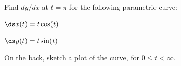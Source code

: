 Find $dy/dx$ at $t=\pi$ for the following parametric curve:

\medskip \noindent $\ds x(t) = t \cos(t)$

\medskip \noindent $\ds y(t) = t \sin(t)$

\vspace{80mm}

On the back, sketch a plot of the curve, for $0\le t <\infty$.
